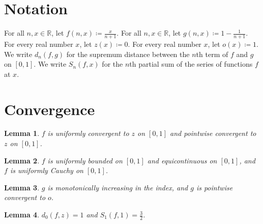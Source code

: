 \documentclass{article}
\newtheorem{lemma}{Lemma}
\begin{document}
\section{Notation}

For all $n,x\in\mathbb{R}$, let $f(n,x)\coloneqq\frac{x}{n+1}$.
For all $n,x\in\mathbb{R}$, let $g(n,x)\coloneqq1-\frac{1}{n+1}$.
For every real number $x$, let $z(x)\coloneqq0$.
For every real number $x$, let $o(x)\coloneqq1$.
We write $d_n(f,g)$ for the supremum distance between the $n$th term of $f$ and $g$ on $[0,1]$.
We write $S_n(f,x)$ for the $n$th partial sum of the series of functions $f$ at $x$.

\section{Convergence}

\begin{lemma}\label{uniform}
$f$ is uniformly convergent to $z$ on $[0,1]$ and pointwise convergent to $z$ on $[0,1]$.
\end{lemma}

\begin{lemma}\label{bounded}
$f$ is uniformly bounded on $[0,1]$ and equicontinuous on $[0,1]$, and $f$ is uniformly Cauchy on $[0,1]$.
\end{lemma}

\begin{lemma}\label{monotone}
$g$ is monotonically increasing in the index, and $g$ is pointwise convergent to $o$.
\end{lemma}

\begin{lemma}\label{distance}
$d_0(f,z)=1$ and $S_1(f,1)=\frac32$.
\end{lemma}
\end{document}
